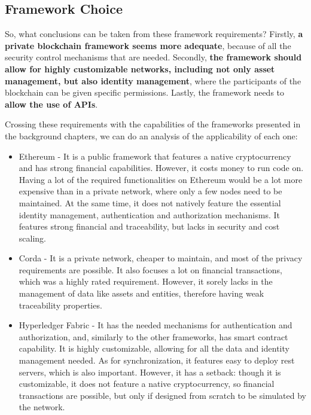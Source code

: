 
\subsection{Framework Choice}

So, what conclusions can be taken from these framework requirements? Firstly, \textbf{a private blockchain framework seems more adequate}, because of all the security control mechanisms that are needed. Secondly, \textbf{the framework should allow for highly customizable networks, including not only asset management, but also identity management}, where the participants of the blockchain can be given specific permissions. Lastly, the framework needs to \textbf{allow the use of APIs}.

Crossing these requirements with the capabilities of the frameworks presented in the background chapters, we can do an analysis of the applicability of each one:
\begin{itemize}
	\item Ethereum - It is a public framework that features a native cryptocurrency and has strong financial capabilities. However, it costs money to run code on. Having a lot of the required functionalities on Ethereum would be a lot more expensive than in a private network, where only a few nodes need to be maintained. At the same time, it does not natively feature the essential identity management, authentication and authorization mechanisms. It features strong financial and traceability, but lacks in security and cost scaling.
	\item Corda - It is a private network, cheaper to maintain, and most of the privacy requirements are possible. It also focuses a lot on financial transactions, which was a highly rated requirement. However, it sorely lacks in the management of data like assets and entities, therefore having weak traceability properties.
	\item Hyperledger Fabric - It has the needed mechanisms for authentication and authorization, and, similarly to the other frameworks, has smart contract capability. It is highly customizable, allowing for all the data and identity management needed. As for synchronization, it features easy to deploy rest servers, which is also important. However, it has a setback: though it is customizable, it does not feature a native cryptocurrency, so financial transactions are possible, but only if designed from scratch to be simulated by the network.
\end{itemize}

